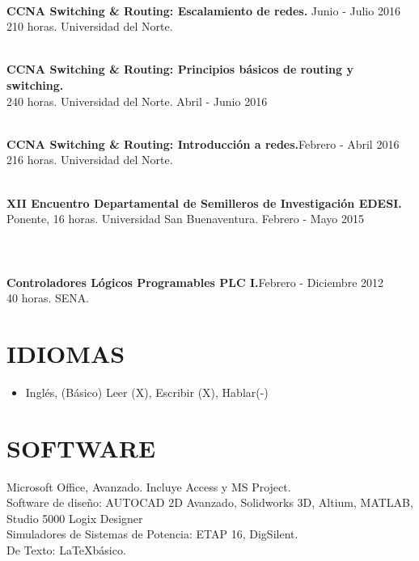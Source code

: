 \documentclass[margin]{res}
\begin{document}
\begin{resume}
\\\textbf{CCNA Switching \& Routing: Escalamiento de redes.} \hfill Junio - Julio 2016
\\210 horas. Universidad del Norte. 

\\\textbf{CCNA Switching \& Routing: Principios básicos de routing y switching.}
\\240 horas. Universidad del Norte. \hfill Abril - Junio 2016

\\\textbf{CCNA Switching \& Routing: Introducción a redes.}\hfill Febrero - Abril 2016
\\216 horas. Universidad del Norte. 

\\\textbf{XII Encuentro Departamental de Semilleros de Investigación EDESI.}
\\Ponente, 16 horas. Universidad San Buenaventura. \hfill Febrero - Mayo 2015


\section{\centering}
\hfill
\\\textbf{Controladores Lógicos Programables PLC I.}\hfill Febrero - Diciembre 2012
\\40 horas. SENA. 

\hfill
\section{IDIOMAS}

\begin{itemize}
  \item Inglés,  (Básico) \hfill Leer (X), Escribir (X), Hablar(-)

\end{itemize}

\section{SOFTWARE}
Microsoft Office, Avanzado. Incluye Access y MS Project.\\
Software de diseño: AUTOCAD 2D Avanzado, Solidworks 3D, Altium, MATLAB, Studio 5000 Logix Designer\\
Simuladores de Sistemas de Potencia: ETAP 16, DigSilent.\\
De Texto: \LaTeX básico.



\end{resume}
\end{document}
